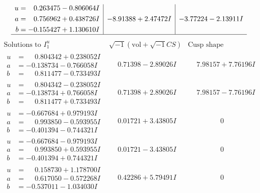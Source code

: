 \documentclass[1p]{elsarticle_modified}
\theoremstyle{definition}
\newcommand{\I}{\sqrt{-1}}
\begin{document}
$$\begin{array}{c|c|c}
\begin{aligned}
u &= \phantom{-}0.263475 - 0.806064 I \\
a &= \phantom{-}0.756962 + 0.438726 I \\
b &= -0.155427 + 1.130610 I\end{aligned}
 & -8.91388 + 2.47472 I & -3.77224 - 2.13911 I\\
 \hline 
 \end{array}$$\newpage$$\begin{array}{c|c|c}  
\text{Solutions to }I^u_{1}& \I (\text{vol} + \sqrt{-1}CS) & \text{Cusp shape}\\
 \hline 
\begin{aligned}
u &= \phantom{-}0.804342 + 0.238052 I \\
a &= -0.138734 - 0.766058 I \\
b &= \phantom{-}0.811477 - 0.733493 I\end{aligned}
 & \phantom{-}0.71398 - 2.89026 I & \phantom{-}7.98157 + 7.76196 I \\ \hline\begin{aligned}
u &= \phantom{-}0.804342 - 0.238052 I \\
a &= -0.138734 + 0.766058 I \\
b &= \phantom{-}0.811477 + 0.733493 I\end{aligned}
 & \phantom{-}0.71398 + 2.89026 I & \phantom{-}7.98157 - 7.76196 I \\ \hline\begin{aligned}
u &= -0.667684 + 0.979193 I \\
a &= \phantom{-}0.993850 - 0.593955 I \\
b &= -0.401394 - 0.744321 I\end{aligned}
 & \phantom{-}0.01721 + 3.43805 I & \phantom{-0.000000 } 0 \\ \hline\begin{aligned}
u &= -0.667684 - 0.979193 I \\
a &= \phantom{-}0.993850 + 0.593955 I \\
b &= -0.401394 + 0.744321 I\end{aligned}
 & \phantom{-}0.01721 - 3.43805 I & \phantom{-0.000000 } 0 \\ \hline\begin{aligned}
u &= \phantom{-}0.158730 + 1.178700 I \\
a &= \phantom{-}0.617050 - 0.572268 I \\
b &= -0.537011 - 1.034030 I\end{aligned}
 & \phantom{-}0.42286 + 5.79491 I & \phantom{-0.000000 } 0 \\ \hline\begin{aligned}

\end{aligned}
\end{array}$$
\end{document}
